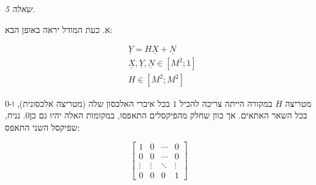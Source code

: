 \documentclass[a4paper]{iacas}
\begin{document}
\newpage

\begin{hebrew}
\textit{\huge שאלה 5.}

א. כעת המודל יראה באופן הבא:
\end{hebrew}

\begin{equation*}
\begin{aligned}
&\underline{Y} = H\underline{X} + \underline{N} \\ 
&\underline{X} , \underline{Y}, \underline{N}  \in [M^2 ; 1] \\
&H \in [M^2 ; M^2]
\end{aligned}
\end{equation*}

\begin{hebrew}
מטריצה $H$ במקורה הייתה צריכה להכיל $1$ בכל איברי האלכסון שלה (מטריצה אלכסונית), ו-$0$ בכל השאר האתאים. אך כוון שחלק מהפיקסלים התאפסו, במקומות האלה יהיו  גם כן$0$. נניח, שפיקסל השני התאפס:
\end{hebrew}
\newline
\begin{equation*}
\begin{bmatrix}
1 & 0 & \cdots & 0\\
0 & 0 & \cdots & 0\\
\vdots & \vdots & \ddots & \vdots \\
0 & 0 & 0 & 1
\end{bmatrix}
\end{equation*}
\newline
\end{document}

